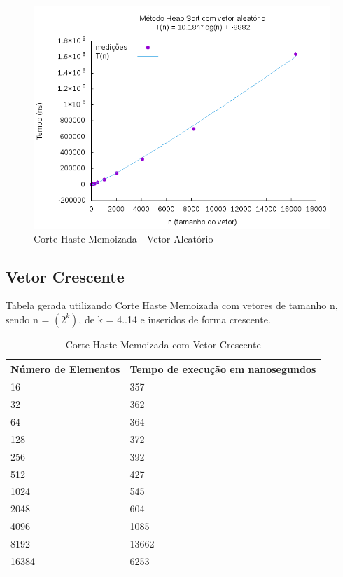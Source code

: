 \documentclass[12pt,a4paper,twoside]{report}
\begin{document}
\begin{figure}[H]
    \centering
    \includegraphics[width=0.7\linewidth]{graficos/HeapSort/vIntAleatorio/vIntAleatorio.png}
  \caption{Corte Haste Memoizada - Vetor Aleatório}
\end{figure}



\subsection{Vetor Crescente}
Tabela gerada utilizando Corte Haste Memoizada com vetores de tamanho n, sendo n = $(2^k)$, de k = 4..14 e inseridos de forma crescente.
\begin{table}[H]
\centering
\caption{Corte Haste Memoizada com Vetor Crescente}
\label{my-label}
\begin{tabular}{|l|l|}
\hline
\multicolumn{1}{|c|}{\textbf{Número de Elementos}} & \multicolumn{1}{c|}{\textbf{Tempo de execução em nanosegundos}} \\ \hline
16 & 357 \\ \hline
32 & 362 \\ \hline
64 & 364 \\ \hline
128 & 372 \\ \hline
256 & 392 \\ \hline
512 & 427 \\ \hline
1024 & 545 \\ \hline
2048 & 604 \\ \hline
4096 & 1085 \\ \hline
8192 & 13662 \\ \hline
16384 & 6253 \\ \hline
\end{tabular}
\end{table}
\end{document}
